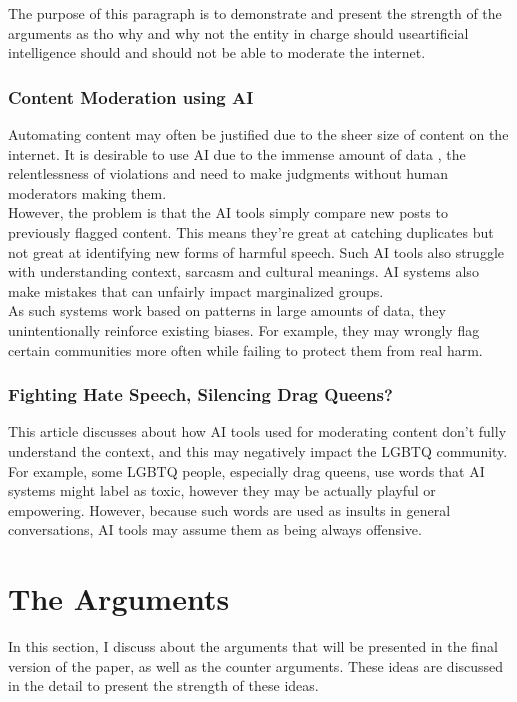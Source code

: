 \documentclass[a4paper]{article}
\begin{document}
\noindent The purpose of this paragraph is to demonstrate and present the strength of the arguments as tho why and
why not the entity in charge should useartificial intelligence should and should not be able to moderate the internet.

\subsubsection{Content Moderation using AI}
Automating content may often be justified due to the sheer size of content on the internet. It is desirable to use AI
due to the immense amount of data , the relentlessness of violations and need to make judgments without human 
moderators making them. \\

\noindent However, the problem is that the AI tools simply compare new posts to previously flagged content. This means
they're great at catching duplicates but not great at identifying new forms of harmful speech. Such AI tools also 
struggle with understanding context, sarcasm and cultural meanings. AI systems also make mistakes that can unfairly 
impact marginalized groups. \\

\noindent As such systems work based on patterns in large amounts of data, they unintentionally 
reinforce existing biases. For example, they may wrongly flag certain communities more often while failing to protect 
them from real harm.

\subsubsection{Fighting Hate Speech, Silencing Drag Queens?}
This article discusses about how AI tools used for moderating content don't fully understand the context, and this may
negatively impact the LGBTQ community. For example, some LGBTQ people, especially drag queens, use words that AI 
systems might label as toxic, however they may be actually playful or empowering. However, because such words are 
used as insults in general conversations, AI tools may assume them as being always offensive.

\section{The Arguments}
In this section, I discuss about the arguments that will be presented in the final version of the paper, as well as 
the counter arguments. These ideas are discussed in the detail to present the strength of these ideas.
\end{document}
